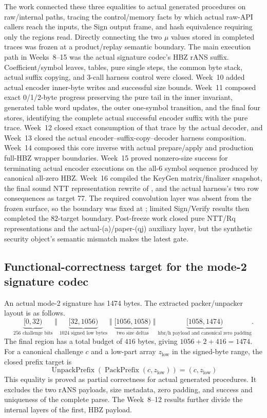 The work connected these three equalities to actual generated procedures on
raw/internal paths, tracing the control/memory facts by which actual raw-API
callers reach the inputs, the Sign output frame, and hash equivalence requiring
only the regions read. Directly connecting the two \(\mu\) values stored in
completed traces was frozen at a product/replay semantic boundary.
The main execution path in Weeks~8--15 was the actual signature codec's HBZ
rANS suffix. Coefficient/symbol leaves, tables, pure single steps, the common
byte stack, actual suffix copying, and 3-call harness control were closed.
Week~10 added actual encoder inner-byte writes and successful size bounds.
Week~11 composed exact 0/1/2-byte progress preserving the pure tail in the
inner invariant, generated table word updates, the outer one-symbol transition,
and the final four stores, identifying the complete actual successful encoder
suffix with the pure trace. Week~12 closed exact consumption of that trace by
the actual decoder, and Week~13 closed the actual encoder--suffix-copy--decoder
harness composition. Week~14 composed this core inverse with actual
prepare/apply and production full-HBZ wrapper boundaries. Week~15 proved
nonzero-size success for terminating actual encoder executions on the all-6
symbol sequence produced by canonical all-zero HBZ. Week~16 compiled the KeyGen
matrix/finalizer snapshot, the final sound NTT representation rewrite of
, and the actual harness's two row consequences as
target 77. The required convolution layer was absent from the frozen surface,
so the boundary was fixed at ; limited Sign/Verify
results then completed the 82-target  boundary.
Post-freeze work closed pure NTT/Rq representations and the
actual-(a)/paper-(qj) auxiliary layer, but the synthetic security object's
semantic mismatch makes  the latest gate.

\subsection{Functional-correctness target for the mode-2 signature codec}

An actual mode-2 signature has 1474 bytes. The extracted packer/unpacker
layout is as follows.
\[
\underbrace{[0,32)}_{256\text{ challenge bits}}
\;\Vert\;
\underbrace{[32,1056)}_{1024\text{ signed low bytes}}
\;\Vert\;
\underbrace{[1056,1058)}_{\text{two size deltas}}
\;\Vert\;
\underbrace{[1058,1474)}_{\text{hbz/h payload and canonical zero padding}}.
\]
The final region has a total budget of \(416\) bytes, giving
\(1056+2+416=1474\). For a canonical challenge \(c\) and a low-part array
\(z_{\mathrm{low}}\) in the signed-byte range, the closed prefix target is
\[
  \operatorname{UnpackPrefix}
    (\operatorname{PackPrefix}(c,z_{\mathrm{low}}))
  =(c,z_{\mathrm{low}})
\]
This equality is proved as partial correctness for actual generated
procedures. It excludes the two rANS payloads, size metadata, zero padding,
and success and uniqueness of the complete parse. The Week~8--12 results
further divide the internal layers of the first, HBZ payload.

